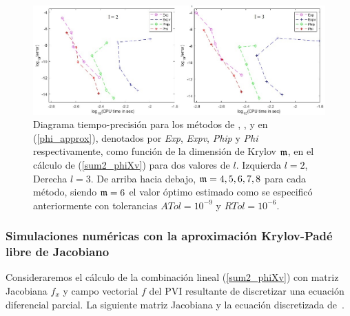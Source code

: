 \begin{figure}[ht]
	\includegraphics[scale=0.55]{Graphics/phil2l3.jpg}
	\caption{Diagrama tiempo-precisión para los métodos de \cite{hochbruck1997krylov}, \cite{sidje1998expokit}, \cite{niesen2012algorithm} y en (\ref{phi_approx}), denotados por \textit{Exp}, \textit{Expv}, \textit{Phip} y \textit{Phi} respectivamente, como función de la dimensión de Krylov $\mathfrak{m}$, en el cálculo de  (\ref{sum2_phiXv}) para dos valores de $l$. Izquierda $l=2$, Derecha $l=3$. De arriba hacia debajo, $\mathfrak{m}=4,5,6,7,8$ para cada método, siendo $\mathfrak{m}=6$ el valor óptimo estimado como se especificó anteriormente con tolerancias $ATol=10^{-9}$ y $RTol=10^{-6}$.}
	\label{fig:SumPhi}
\end{figure}

\subsubsection{Simulaciones numéricas con la aproximación Krylov-Padé libre de Jacobiano}
Consideraremos el cálculo de la combinación lineal (\ref{sum2_phiXv}) con matriz Jacobiana $f_x$ y campo vectorial $f$ del PVI resultante de discretizar una ecuación diferencial parcial. La siguiente matriz Jacobiana y la ecuación discretizada  de~\cite{tokman2006efficient}. 


